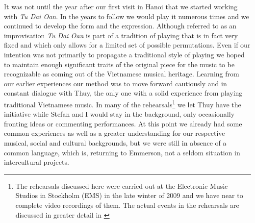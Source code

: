\documentclass[a4paper]{article}
\begin{document}
It was not until the year after our first visit in Hanoi that we started working with \emph{Tu Dai Oan}. In the years to follow we would play it numerous times and we continued to develop the form and the expression. Although referred to as an improvisation \emph{Tu Dai Oan} is part of a tradition of playing that is in fact very fixed and which only allows for a limited set of possible permutations. Even if our intention was not primarily to propagate a traditional style of playing we hoped to maintain enough significant traits of the original piece for the music to be recognizable as coming out of the Vietnamese musical heritage. Learning from our earlier experiences our method was to move forward cautiously and in constant dialogue with Thuy, the only one with a solid experience from playing traditional Vietnamese music. In many of the rehearsals\footnote{The rehearsals discussed here were carried out at the Electronic Music Studios in Stockholm (EMS) in the late winter of 2009 and we have near to complete video recordings of them. The actual events in the rehearsals are discussed in greater detail in \citet{Ostersjo2013}} we let Thuy have the initiative while Stefan and I would stay in the background, only occasionally fronting ideas or commenting performances. At this point we already had some common experiences as well as a greater understanding for our respective musical, social and cultural backgrounds, but we were still in absence of a common language, which is, returning to Emmerson, not a seldom situation in intercultural projects. 
\end{document}
